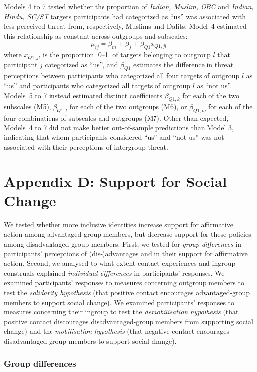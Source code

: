 \documentclass[12pt, a4paper]{article}
\begin{document}
Models 4 to 7 tested whether the proportion of \emph{Indian, Muslim, OBC} and \emph{Indian, Hindu, SC/ST} targets participants had categorized as ``us'' was associated with less perceived threat from, respectively, Muslims and Dalits. Model~4 estimated this relationship as constant across outgroups and subscales: $$ \mu_{ij} = \beta_m + \beta_{j} + \beta_{Q1}x_{Q1,jl} $$ where $x_{Q1,jl}$ is the proportion [0--1] of targets belonging to outgroup $l$ that participant $j$ categorized as ``us'', and $\beta_{Q1}$ estimates the difference in threat perceptions between participants who categorized all four targets of outgroup $l$ as ``us'' and participants who categorized all targets of outgroup $l$ as ``not us''. Models~5 to 7 instead estimated distinct coefficients $\beta_{Q1,k}$ for each of the two subscales (M5), $\beta_{Q1,l}$ for each of the two outgroups (M6), or $\beta_{Q1,m}$ for each of the four combinations of subscales and outgroups (M7). Other than expected, Models~4 to 7 did not make better out-of-sample predictions than Model 3, indicating that whom participants considered ``us'' and ``not us'' was not associated with their perceptions of intergroup threat.

\section{Appendix D: Support for Social Change}

We tested whether more inclusive identities increase support for affirmative action among advantaged-group members, but decrease support for these policies among disadvantaged-group members. First, we tested for \emph{group differences} in participants' perceptions of (dis-)advantages and in their support for affirmative action. Second, we analysed to what extent contact experiences and ingroup construals explained \emph{individual differences} in participants' responses. We examined participants' responses to measures concerning outgroup members to test the \emph{solidarity hypothesis} (that positive contact encourages advantaged-group members to support social change). We examined participants' responses to measures concerning their ingroup to test the \emph{demobilisation hypothesis} (that positive contact discourages disadvantaged-group members from supporting social change) and the \emph{mobilisation hypothesis} (that negative contact encourages disadvantaged-group members to support social change).

\subsubsection{Group differences}
\end{document}

